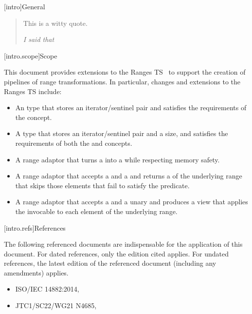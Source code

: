 [intro]{General}

\begin{quote}
This is a witty quote.
\begin{flushright}
\textemdash \textit{I said that}
\end{flushright}
\end{quote}

[intro.scope]{Scope}

\pnum
This document provides extensions to the Ranges TS~\cite{ranges-ts} to
support the creation of pipelines of range transformations. In particular,
changes and extensions to the Ranges TS include:

\begin{itemize}
\item An  type that stores an iterator/sentinel pair and
satisfies the requirements of the  concept.
\item A  type that stores an iterator/sentinel pair
and a size, and satisfies the requirements of both the  and
 concepts.
\item A  range adaptor that turns a  into a
 while respecting memory safety.
\item A  range adaptor that accepts a  and a
 and returns a  of the underlying range that skips
those elements that fail to satisfy the predicate.
\item A  range adaptor that accepts a  and a
unary  and produces a view that applies the invocable to
each element of the underlying range.
\end{itemize}

[intro.refs]{References}

\pnum
The following referenced documents are indispensable for the
application of this document. For dated references, only the
edition cited applies. For undated references, the latest edition
of the referenced document (including any amendments) applies.

\begin{itemize}
\item ISO/IEC 14882:2014, 
\item JTC1/SC22/WG21 N4685, 
\end{itemize}

